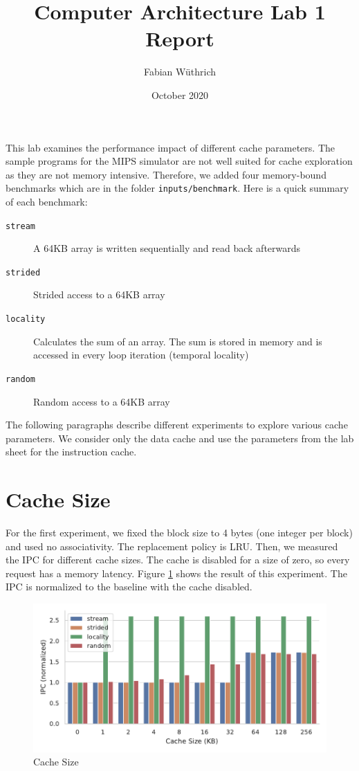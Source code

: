 \documentclass[a4paper]{article}
\begin{document}
\title{Computer Architecture Lab 1 Report}
\author{Fabian Wüthrich}
\date{October 2020}
\maketitle

This lab examines the performance impact of different cache parameters. The
sample programs for the MIPS simulator are not well suited for cache exploration
as they are not memory intensive. Therefore, we added four memory-bound
benchmarks which are in the folder \verb|inputs/benchmark|. Here is a quick summary of
each benchmark:
\begin{description}
    \item[\texttt{stream}] A 64KB array is written sequentially and read back afterwards
    \item[\texttt{strided}] Strided access to a 64KB array
    \item[\texttt{locality}] Calculates the sum of an array. The sum is stored
        in memory and is accessed in every loop iteration (temporal locality)
    \item[\texttt{random}] Random access to a 64KB array
\end{description}
The following paragraphs describe different experiments to explore various cache
parameters. We consider only the data cache and use the parameters from the lab
sheet for the instruction cache.

\section{Cache Size}

For the first experiment, we fixed the block size to 4 bytes (one integer per
block) and used no associativity. The replacement policy is LRU. Then, we
measured the IPC for different cache sizes. The cache is disabled for a size of
zero, so every request has a memory latency. Figure \ref{fig:cache-size} shows
the result of this experiment. The IPC is normalized to the baseline with the
cache disabled.
\begin{figure}
    \centering
    \includegraphics[width=\textwidth]{cache_size}
    \caption{Cache Size}
    \label{fig:cache-size}
\end{figure}
\end{document}
